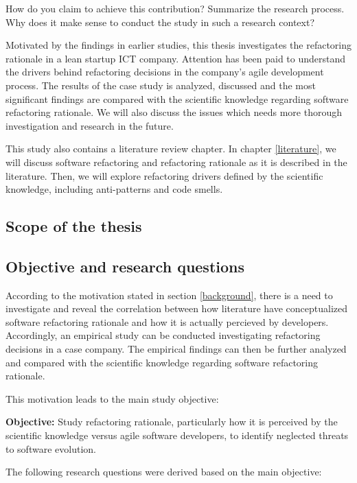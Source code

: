 How do you claim to achieve this contribution? Summarize the research process. Why does it make sense to conduct the study in such a research context? 

Motivated by the findings in earlier studies, this thesis investigates the refactoring rationale in a lean startup ICT company. Attention has been paid to understand the drivers behind refactoring decisions in the company's agile development process. The results of the case study is analyzed, discussed and the most significant findings are compared with the scientific knowledge regarding software refactoring rationale. We will also discuss the issues which needs more thorough investigation and research in the future.

This study also contains a literature review chapter. In chapter \ref{literature}, we will discuss software refactoring and refactoring rationale as it is described in the literature. Then, we will explore refactoring drivers defined by the scientific knowledge, including anti-patterns and code smells.

\subsection{Scope of the thesis} \label{scope}

\subsection{Objective and research questions} \label{questions}
According to the motivation stated in section \ref{background}, there is a need to investigate and reveal the correlation between how literature have conceptualized software refactoring rationale and how it is actually percieved by developers. Accordingly, an empirical study can be conducted investigating refactoring decisions in a case company. The empirical findings can then be further analyzed and compared with the scientific knowledge regarding software refactoring rationale. 

This motivation leads to the main study objective:

\textbf{Objective:} Study refactoring rationale, particularly how it is perceived by the scientific knowledge versus agile software developers, to identify neglected threats to software evolution.

The following research questions were derived based on the main objective:

